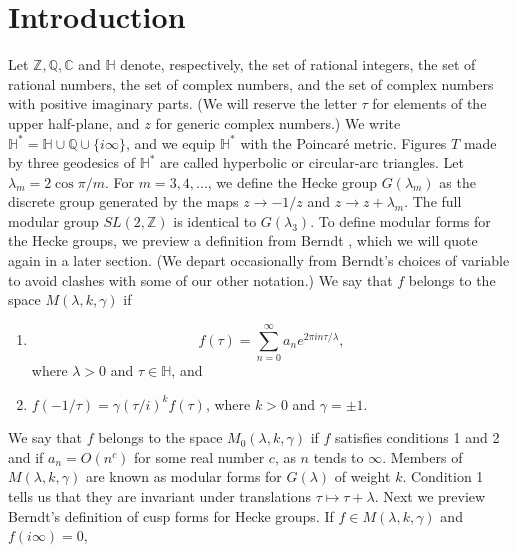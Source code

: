 \documentclass{article}
\begin{document}
\section{Introduction}
Let $\mathbb{Z}, \mathbb{Q}, 
\mathbb{C}$ and $\mathbb{H}$ 
denote, respectively, the set of rational integers,
the set of rational
numbers, the set  of 
complex numbers, and the set of
complex numbers
with positive imaginary parts. 
(We will reserve 
the letter $\tau$ for elements of the
upper half-plane, and $z$
for generic complex numbers.)
We write
$\mathbb{H}^* = \mathbb{H} \cup \mathbb{Q} \cup 
\{i \infty\}$, and we equip $\mathbb{H}^*$
with the Poincar{\'e} metric. Figures
$T$ made by three geodesics
of $\mathbb{H}^*$
are called hyperbolic or
circular-arc triangles.
Let $\lambda_m = 2 \cos \pi/m$.
For $m = 3, 4, ...$,
we define the Hecke group
$G(\lambda_m)$
as the discrete group generated by 
the maps $z \rightarrow -1/z$
and $ z \rightarrow z + \lambda_m$.
The full modular group $SL(2,\mathbb{Z})$
is identical to $G(\lambda_3)$.
\newline  \newline \noindent
To define modular forms for
the Hecke groups, we preview
a definition from Berndt  
\cite{berndt2008hecke}, 
which we will quote again
in a later section.
(We depart occasionally from Berndt's
choices of variable to avoid 
clashes with some of our other
notation.)
\newline \newline \noindent
We say that $f$ belongs to the space
$M(\lambda, k, \gamma)$ if
\begin{enumerate}
    \item 
    $$ f(\tau) = \sum_{n = 0}^{\infty}
    a_n e^{2 \pi i n \tau/\lambda},
    $$
    where $\lambda > 0$ and 
    $\tau \in \mathbb{H}$, and
    \item  $f(-1/\tau) = \gamma(\tau/i)^k f(\tau)$,
    where $k > 0$ and $\gamma = \pm 1$.
\end{enumerate}
We say that $f$ belongs to the space
$M_0(\lambda,k, \gamma)$ if $f$ satisfies conditions
1 and 2 and if $a_n = O(n^c)$
for some real number $c$, as $n$ tends to $\infty$.
\newline \newline \noindent
Members of $M(\lambda, k, \gamma)$
are known as modular forms for 
$G(\lambda)$ of weight $k$.
Condition 1 tells us that  they
are invariant under translations
$\tau \mapsto \tau + \lambda$.
Next we preview Berndt's definition
of cusp forms for Hecke groups.
If $f\in M(\lambda, k, \gamma)$
and $f(i \infty) = 0$,
\end{document}
